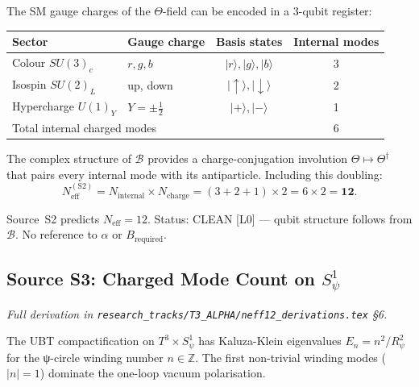 \documentclass[12pt,a4paper]{article}
\theoremstyle{definition}
\theoremstyle{remark}
\begin{document}
\medskip
The SM gauge charges of the $\Theta$-field can be encoded in a 3-qubit register:

\begin{center}
\renewcommand{\arraystretch}{1.2}
\begin{tabular}{llcc}
\toprule
Sector & Gauge charge & Basis states & Internal modes \\
\midrule
Colour $SU(3)_c$ & $r,g,b$ & $|r\rangle,|g\rangle,|b\rangle$ & 3 \\
Isospin $SU(2)_L$ & up, down & $|\uparrow\rangle,|\downarrow\rangle$ & 2 \\
Hypercharge $U(1)_Y$ & $Y=\pm\tfrac{1}{2}$ & $|+\rangle,|-\rangle$ & 1 \\
\midrule
\multicolumn{3}{l}{Total internal charged modes} & 6 \\
\bottomrule
\end{tabular}
\end{center}

The complex structure of $\mathcal{B}$ provides a charge-conjugation involution
$\Theta \mapsto \Theta^\dagger$ that pairs every internal mode with its antiparticle.
Including this doubling:
\begin{equation}
  N_{\mathrm{eff}}^{(\mathrm{S2})}
  = N_{\mathrm{internal}} \times N_{\mathrm{charge}}
  = (3+2+1) \times 2
  = 6 \times 2
  = \mathbf{12}.
  \label{eq:S2}
\end{equation}

\begin{resultbox}
  Source~S2 predicts $N_{\mathrm{eff}} = 12$.
  Status: CLEAN [L0] — qubit structure follows from $\mathcal{B}$.
  No reference to $\alpha$ or $B_{\mathrm{required}}$.
\end{resultbox}

\subsection{Source S3: Charged Mode Count on $S^1_\psi$}
\label{ssec:S3}

\textit{Full derivation in \texttt{research\_tracks/T3\_ALPHA/neff12\_derivations.tex} \S6.}

\medskip
The UBT compactification on $T^3\times S^1_\psi$ has Kaluza-Klein eigenvalues
$E_{n} = n^2/R_\psi^2$ for the ψ-circle winding number $n\in\mathbb{Z}$.
The first non-trivial winding modes ($|n|=1$) dominate the one-loop vacuum
polarisation.
\end{document}
